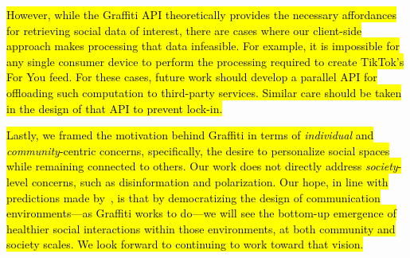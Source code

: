 \hl{%
However, while the Graffiti API theoretically provides the necessary
affordances for retrieving social data of interest,
there are cases where our client-side
approach makes processing that data infeasible.
For example, it is impossible for any single consumer device to
perform the processing required to create TikTok's For You feed.
For these cases, future work should develop
a parallel API for offloading such
computation to third-party services.
Similar care should be taken
in the design of that API to prevent lock-in.
}%

\hl{%
Lastly, we framed the motivation behind Graffiti in terms of
\emph{individual} and \emph{community}-centric concerns,
specifically, the desire to personalize social spaces while remaining connected to others.
Our work does not directly address \emph{society}-level concerns,
such as disinformation and polarization.
Our hope, in line with predictions made by~{\cite{threeleggedstool}}, is that by democratizing
the design of communication environments---as Graffiti works to do---we
will see the bottom-up emergence of healthier social interactions within those environments,
at both community and society scales.
We look forward to continuing to work toward that vision.
}%













